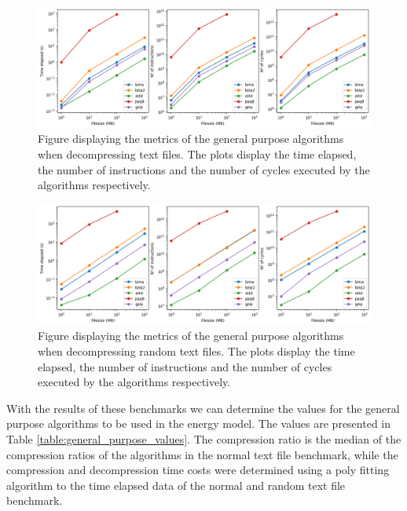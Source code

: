        \begin{figure}[h]
            \centering
            \includegraphics[width=1\textwidth]{figs/text_dstats.png}
            \caption[Figure displaying the metrics of the general purpose algorithms when decompressing text files.] {Figure displaying the metrics of the general purpose algorithms when decompressing text files. The plots display the time elapsed, the number of instructions and the number of cycles executed by the algorithms respectively.}
            \label{fig:text_dstats}
        \end{figure}

        \begin{figure}[h]
            \centering
            \includegraphics[width=1\textwidth]{figs/random_text_dstats.png}
            \caption[Figure displaying the metrics of the general purpose algorithms when decompressing random text files.] {Figure displaying the metrics of the general purpose algorithms when decompressing random text files. The plots display the time elapsed, the number of instructions and the number of cycles executed by the algorithms respectively.}
            \label{fig:random_text_dstats}
        \end{figure}

        With the results of these benchmarks we can determine the values for the general purpose algorithms to be used in the energy model. The values are presented in Table \ref{table:general_purpose_values}. The compression ratio is the median of the compression ratios of the algorithms in the normal text file benchmark, while the compression and decompression time costs were determined using a poly fitting algorithm to the time elapsed data of the normal and random text file benchmark.

